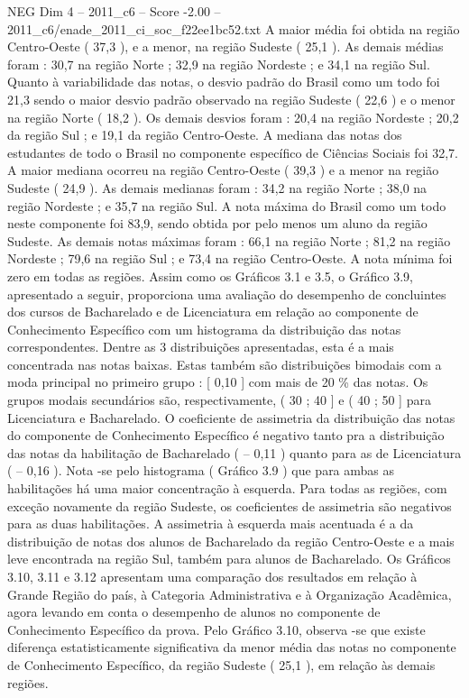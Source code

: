 \begin{textsample}{NEG Dim 4 – 2011\_c6 – Score -2.00 – 2011\_c6/enade\_2011\_ci\_soc\_f22ee1bc52.txt}
A maior média foi obtida na região Centro-Oeste ( 37,3 ), e a menor, na região Sudeste ( 25,1 ).
As demais médias foram : 30,7 na região Norte ; 32,9 na região Nordeste ; e 34,1 na região Sul.
Quanto à variabilidade das notas, o desvio padrão do Brasil como um todo foi 21,3 sendo o maior desvio padrão observado na região Sudeste ( 22,6 ) e o menor na região Norte ( 18,2 ).
Os demais desvios foram : 20,4 na região Nordeste ; 20,2 da região Sul ; e 19,1 da região Centro-Oeste.
A mediana das notas dos estudantes de todo o Brasil no componente específico de Ciências Sociais foi 32,7.
A maior mediana ocorreu na região Centro-Oeste ( 39,3 ) e a menor na região Sudeste ( 24,9 ).
As demais medianas foram : 34,2 na região Norte ; 38,0 na região Nordeste ; e 35,7 na região Sul.
A nota máxima do Brasil como um todo neste componente foi 83,9, sendo obtida por pelo menos um aluno da região Sudeste.
As demais notas máximas foram : 66,1 na região Norte ; 81,2 na região Nordeste ; 79,6 na região Sul ; e 73,4 na região Centro-Oeste.
A nota mínima foi zero em todas as regiões.
Assim como os Gráficos 3.1 e 3.5, o Gráfico 3.9, apresentado a seguir, proporciona uma avaliação do desempenho de concluintes dos cursos de Bacharelado e de Licenciatura em relação ao componente de Conhecimento Específico com um histograma da distribuição das notas correspondentes.
Dentre as 3 distribuições apresentadas, esta é a mais concentrada nas notas baixas.
Estas também são distribuições bimodais com a moda principal no primeiro grupo : [ 0,10 ] com mais de 20 \% das notas.
Os grupos modais secundários são, respectivamente, ( 30 ; 40 ] e ( 40 ; 50 ] para Licenciatura e Bacharelado.
O coeficiente de assimetria da distribuição das notas do componente de Conhecimento Específico é negativo tanto pra a distribuição das notas da habilitação de Bacharelado ( – 0,11 ) quanto para as de Licenciatura ( – 0,16 ).
Nota -se pelo histograma ( Gráfico 3.9 ) que para ambas as habilitações há uma maior concentração à esquerda.
Para todas as regiões, com exceção novamente da região Sudeste, os coeficientes de assimetria são negativos para as duas habilitações.
A assimetria à esquerda mais acentuada é a da distribuição de notas dos alunos de Bacharelado da região Centro-Oeste e a mais leve encontrada na região Sul, também para alunos de Bacharelado.
Os Gráficos 3.10, 3.11 e 3.12 apresentam uma comparação dos resultados em relação à Grande Região do país, à Categoria Administrativa e à Organização Acadêmica, agora levando em conta o desempenho de alunos no componente de Conhecimento Específico da prova.
Pelo Gráfico 3.10, observa -se que existe diferença estatisticamente significativa da menor média das notas no componente de Conhecimento Específico, da região Sudeste ( 25,1 ), em relação às demais regiões.

\end{textsample}
